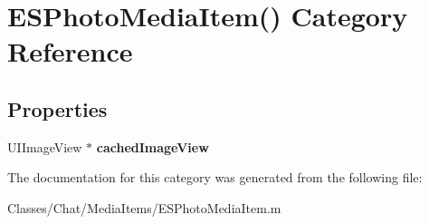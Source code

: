 \hypertarget{category_e_s_photo_media_item_07_08}{}\section{E\+S\+Photo\+Media\+Item() Category Reference}
\label{category_e_s_photo_media_item_07_08}
\subsection*{Properties}
\begin{DoxyCompactItemize}
\item 
\hypertarget{category_e_s_photo_media_item_07_08_a7bf0679b34d0d25e9c9edf4ac6f61940}{}U\+I\+Image\+View $\ast$ {\bfseries cached\+Image\+View}\label{category_e_s_photo_media_item_07_08_a7bf0679b34d0d25e9c9edf4ac6f61940}

\end{DoxyCompactItemize}


The documentation for this category was generated from the following file\+:\begin{DoxyCompactItemize}
\item 
Classes/\+Chat/\+Media\+Items/E\+S\+Photo\+Media\+Item.\+m\end{DoxyCompactItemize}
